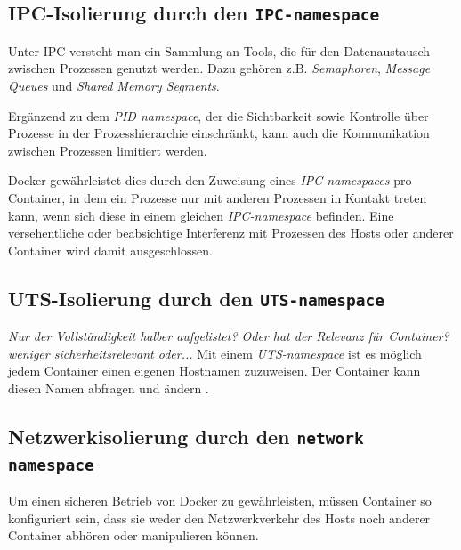 \documentclass[../main.tex]{subfiles}
\begin{document}
			\cite[S.4]{dockerSec1}



    \subsection{\acrshort{IPC}-Isolierung durch den \texttt{\acrshort{IPC}-namespace}}
			Unter \acrshort{IPC} versteht man ein Sammlung an Tools, die für den Datenaustausch zwischen Prozessen genutzt werden. Dazu gehören z.B. \emph{Semaphoren}, \emph{Message Queues} und \emph{Shared Memory Segments}.

			Ergänzend zu dem \emph{\acrshort{PID} namespace}, der die Sichtbarkeit sowie Kontrolle über Prozesse in der Prozesshierarchie einschränkt, kann auch die Kommunikation zwischen Prozessen limitiert werden.

			Docker gewährleistet dies durch den Zuweisung eines \emph{\acrshort{IPC}-namespaces} pro Container, in dem ein Prozesse nur mit anderen Prozessen in Kontakt treten kann, wenn sich diese in einem gleichen \emph{\acrshort{IPC}-namespace} befinden. Eine versehentliche oder beabsichtige Interferenz mit Prozessen des Hosts oder anderer Container wird damit ausgeschlossen.

			\cite[S.4]{dockerSec1}


    \subsection{\acrshort{UTS}-Isolierung durch den \texttt{\acrshort{UTS}-namespace}}
			\emph{Nur der Vollständigkeit halber aufgelistet? Oder hat der Relevanz für Container?}
			\emph{weniger sicherheitsrelevant oder...}
			Mit einem \emph{\acrshort{UTS}-namespace} ist es möglich jedem Container einen eigenen Hostnamen zuzuweisen. Der Container kann diesen Namen abfragen und ändern \cite[S.3]{virtVSContainer}.
    \subsection{Netzwerkisolierung durch den \texttt{network namespace}}
			Um einen sicheren Betrieb von Docker zu gewährleisten, müssen Container so konfiguriert sein, dass sie weder den Netzwerkverkehr des Hosts noch anderer Container abhören oder manipulieren können.
\end{document}
